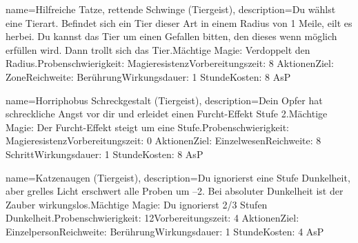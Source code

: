 {
    name={Hilfreiche Tatze, rettende Schwinge (Tiergeist)},
    description={Du wählst eine Tierart. Befindet sich ein Tier dieser Art in einem Radius von 1 Meile, eilt es herbei. Du kannst das Tier um einen Gefallen bitten, den dieses wenn möglich erfüllen wird. Dann trollt sich das Tier.\newline Mächtige Magie: Verdoppelt den Radius.\newline Probenschwierigkeit: Magieresistenz\newline Vorbereitungszeit: 8 Aktionen\newline Ziel: Zone\newline Reichweite: Berührung\newline Wirkungsdauer: 1 Stunde\newline Kosten: 8 AsP}
}


{
    name={Horriphobus Schreckgestalt (Tiergeist)},
    description={Dein Opfer hat schreckliche Angst vor dir und erleidet einen Furcht-Effekt Stufe 2.\newline Mächtige Magie: Der Furcht-Effekt steigt um eine Stufe.\newline Probenschwierigkeit: Magieresistenz\newline Vorbereitungszeit: 0 Aktionen\newline Ziel: Einzelwesen\newline Reichweite: 8 Schritt\newline Wirkungsdauer: 1 Stunde\newline Kosten: 8 AsP}
}


{
    name={Katzenaugen (Tiergeist)},
    description={Du ignorierst eine Stufe Dunkelheit, aber grelles Licht erschwert alle Proben um –2. Bei absoluter Dunkelheit ist der Zauber wirkungslos.\newline Mächtige Magie: Du ignorierst 2/3 Stufen Dunkelheit.\newline Probenschwierigkeit: 12\newline Vorbereitungszeit: 4 Aktionen\newline Ziel: Einzelperson\newline Reichweite: Berührung\newline Wirkungsdauer: 1 Stunde\newline Kosten: 4 AsP}
}


